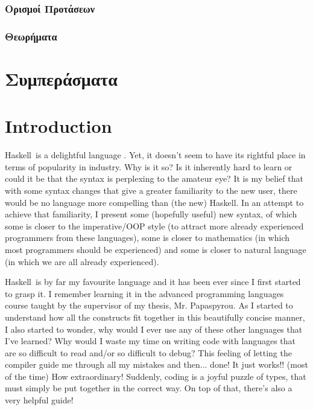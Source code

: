 \documentclass[diploma]{softlab-thesis}
\def\H{Haskell}
\begin{document}
\subsection{Ορισμοί Προτάσεων}

\subsection{Θεωρήματα}

\chapter{Συμπεράσματα}

\englishtext

\chapter{Introduction}

\H\ is a delightful language \cite{marlow2010haskell}.
Yet, it doesn't seem to have its rightful place
in terms of popularity in industry. Why is it so?  Is it inherently hard to
learn or could it be that the syntax is perplexing to the amateur eye? It is
my belief that with some syntax changes that give a greater familiarity to the
new user, there would be no language more compelling than (the new) \H. In an
attempt to achieve that familiarity, I present some (hopefully useful) new
syntax, of which some is closer to the imperative/OOP style (to attract more
already experienced programmers from these languages), some is closer to
mathematics (in which most programmers should be experienced) and some is
closer to natural language (in which we are all already experienced).

\H\ is by far my favourite language and it has been ever since I first started
to grasp it. I remember learning it in the advanced programming languages
course taught by the supervisor of my thesis, Mr. Papaspyrou. As I started
to understand how all the constructs fit together in this beautifully concise
manner, I also started to wonder, why would I ever use any of these other
languages that I've learned? Why would I waste my time on writing code
with languages that are so difficult to read and/or so difficult to debug?
This feeling of letting the compiler guide me through all my mistakes and
then... done! It just works!! (most of the time) How extraordinary! Suddenly,
coding is a joyful puzzle of types, that must simply be put together
in the correct way. On top of that, there's also a very helpful guide!
\end{document}

